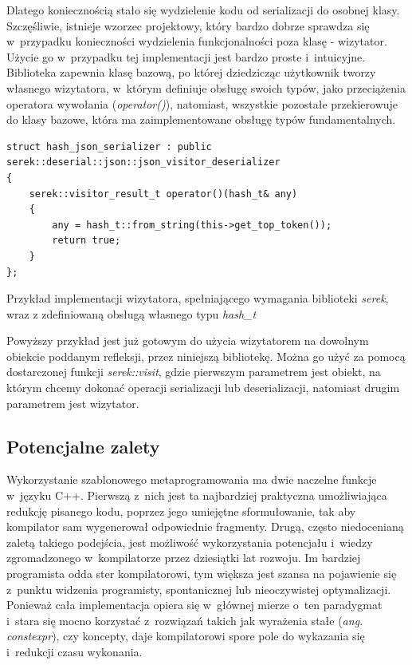 \documentclass[12pt]{article}
\newcommand{\n}{\newline}
\newcommand{\nonpl}[1]{{\it #1}}
\newcommand{\code}[1]{{\it #1}}
\newcommand{\ang}[1]{\nonpl{ang. #1}}
\newcommand{\serek}{\nonpl{serek}}
\begin{document}
{{{				Dlatego koniecznością stało się wydzielenie kodu od serializacji do osobnej klasy. Szczęśliwie, istnieje wzorzec projektowy,
				który bardzo dobrze sprawdza się w~przypadku konieczności wydzielenia funkcjonalności poza klasę - wizytator\cite{visitor_description}.
				Użycie go w~przypadku tej implementacji jest bardzo proste i~intuicyjne. Biblioteka zapewnia klasę bazową, po której dziedzicząc
				użytkownik tworzy własnego wizytatora, w~którym definiuje obsługę swoich typów, jako przeciążenia operatora wywołania (\code{operator()}),
				natomiast, wszystkie pozostałe przekierowuje do klasy bazowe, która ma zaimplementowane obsługę typów fundamentalnych.\n

				\begin{captioned}[H]
					\begin{lstlisting}[frame=single]
struct hash_json_serializer : public serek::deserial::json::json_visitor_deserializer
{
	serek::visitor_result_t operator()(hash_t& any)
	{
		any = hash_t::from_string(this->get_top_token());
		return true;
	}
};
					\end{lstlisting}
					\caption{ Przykład implementacji wizytatora, spełniającego wymagania biblioteki \serek, wraz z zdefiniowaną obsługą własnego typu \code{hash_t}}
					\label{visitor_ex}
				\end{captioned}

				Powyższy przykład jest już gotowym do użycia wizytatorem na dowolnym obiekcie poddanym refleksji, przez niniejszą
				bibliotekę. Można go użyć za pomocą dostarczonej funkcji \code{serek::visit}, gdzie pierwszym parametrem jest obiekt, na którym
				chcemy dokonać operacji serializacji lub deserializacji, natomiast drugim parametrem jest wizytator.
			}
		}

		{
			\subsection{Potencjalne zalety}

			Wykorzystanie szablonowego metaprogramowania\cite{wiki_meta} ma dwie naczelne funkcje w~języku C++. Pierwszą z~nich jest
			ta najbardziej praktyczna umożliwiająca redukcję pisanego kodu, poprzez jego umiejętne sformułowanie, tak aby kompilator
			sam wygenerował odpowiednie fragmenty. Drugą, często niedocenianą zaletą takiego podejścia, jest możliwość wykorzystania
			potencjału i~wiedzy zgromadzonego w~kompilatorze przez dziesiątki lat rozwoju. Im bardziej programista odda ster
			kompilatorowi, tym większa jest szansa na pojawienie się z~punktu widzenia programisty, spontanicznej lub nieoczywistej
			optymalizacji. Ponieważ cała implementacja opiera się w~głównej mierze o~ten paradygmat i~stara się mocno korzystać
			z~rozwiązań takich jak wyrażenia stałe (\ang{constexpr}), czy koncepty, daje kompilatorowi spore pole do wykazania się
			i~redukcji czasu wykonania.
		}
	}
\end{document}
